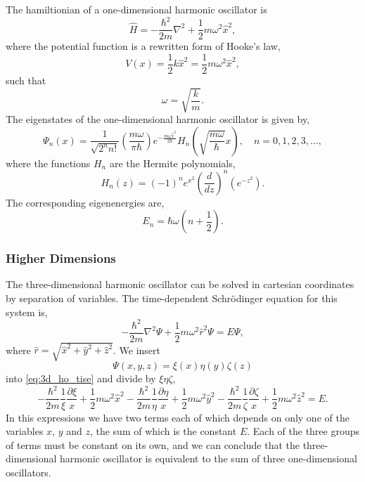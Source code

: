 The hamiltionian of a one-dimensional harmonic oscillator is
\begin{equation}
    \hat{H} = -\frac{\hbar^2}{2m} \nabla^2 + \frac{1}{2}m\omega^2\hat{x}^2,
\end{equation}
where the potential function is a rewritten form of Hooke's law,
\begin{equation}
    V(x) = \frac{1}{2}k \hat{x}^2 = \frac{1}{2}m\omega^2\hat{x}^2,
\end{equation}
such that 
\begin{equation*}
    \omega = \sqrt{\frac{k}{m}}.
\end{equation*}
The eigenstates of the one-dimensional harmonic oscillator is given by,
\begin{equation}
    \Psi_n(x) =
        \frac{1}{\sqrt{2^n n!}} 
        \left(\frac{m\omega}{\pi\hbar} \right) 
        e^{-\frac{m\omega\hat{x}^2}{2\hbar}}
        H_n\left(\sqrt{\frac{m\omega}{\hbar}} x \right),
        \quad n=0,1,2,3,\dots,
\end{equation}
where the functions $H_n$ are the Hermite polynomials,
\begin{equation}
    H_n(z) = 
    (-1)^n e^{x^2}
    \left(\frac{d}{dz} \right)^n
    \left(e^{-z^2} \right).
\end{equation}
The corresponding eigenenergies are,
\begin{equation}
    E_n = \hbar\omega\left(n + \frac{1}{2} \right).
\end{equation}

\subsubsection{Higher Dimensions}

The three-dimensional harmonic oscillator can be solved in cartesian 
coordinates by separation of variables. The time-dependent Schrödinger
equation for this system is,
\begin{equation}
    \label{eq:3d_ho_tise}
    -\frac{\hbar^2}{2m} \nabla^2\Psi
    +\frac{1}{2}m\omega^2\hat{r}^2\Psi = E\Psi,
\end{equation}
where $\hat{r} = \sqrt{\hat{x}^2 + \hat{y}^2 + \hat{z}^2}$. We insert
\begin{equation*}
    \Psi(x, y, z) = \xi(x)\eta(y)\zeta(z)
\end{equation*}
into \autoref{eq:3d_ho_tise} and divide by $\xi\eta\zeta$,
\begin{equation}
    -\frac{\hbar^2}{2m}\frac{1}{\xi}\frac{\partial \xi}{x}
    +\frac{1}{2}m\omega^2\hat{x}^2
    -\frac{\hbar^2}{2m}\frac{1}{\eta}\frac{\partial \eta}{x}
    +\frac{1}{2}m\omega^2\hat{y}^2
    -\frac{\hbar^2}{2m}\frac{1}{\zeta}\frac{\partial \zeta}{x}
    +\frac{1}{2}m\omega^2\hat{z}^2 = E.
\end{equation}
In this expressions we have two terms each of which depends on 
only one of the variables $x$, $y$ and $z$, the sum of which is 
the constant $E$. Each of the three groups of terms must be constant 
on its own, and we can conclude that the three-dimensional harmonic 
oscillator is equivalent to the sum of three one-dimensional 
oscillators.

